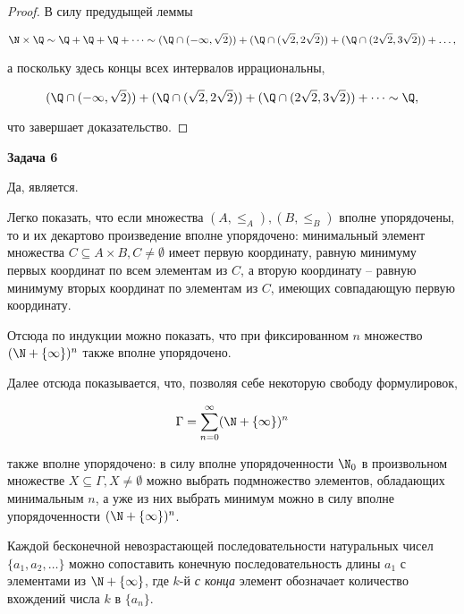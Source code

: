 		\begin{proof}
			В силу предудыщей леммы

			\begin{equation*}
				\N \times \Q \sim \Q + \Q + \Q + \dots \sim (\Q \cap (-\infty, \sqrt{2})) + (\Q \cap (\sqrt{2}, 2\sqrt{2})) + (\Q \cap (2\sqrt{2}, 3\sqrt{2})) + \dots,
			\end{equation*}

			а поскольку здесь концы всех интервалов иррациональны,

			\begin{equation*}
				(\Q \cap (-\infty, \sqrt{2})) + (\Q \cap (\sqrt{2}, 2\sqrt{2})) + (\Q \cap (2\sqrt{2}, 3\sqrt{2})) + \dots \sim \Q,
			\end{equation*}

			что завершает доказательство.
		\end{proof}


	\begin{center}
    \textbf{Задача 6}
\end{center}
		Да, является.

		Легко показать, что если множества $(A, \le_A), (B, \le_B)$ вполне упорядочены, то и их декартово произведение вполне упорядочено: минимальный элемент множества $C \subseteq A \times B, C \ne \emptyset$ имеет первую координату, равную минимуму первых координат по всем элементам из $C$, а вторую координату -- равную минимуму вторых координат по элементам из $C$, имеющих совпадающую первую координату.

		Отсюда по индукции можно показать, что при фиксированном $n$ множество $(\N + \{\infty\})^n$ также вполне упорядочено.

		Далее отсюда показывается, что, позволяя себе некоторую свободу формулировок,

		\begin{equation*}
			\Gamma = \sum_{n=0}^\infty (\N + \{\infty\})^n
		\end{equation*}

		также вполне упорядочено: в силу вполне упорядоченности $\N_0$ в произвольном множестве $X \subseteq \Gamma, X \ne \emptyset$ можно выбрать подмножество элементов, обладающих минимальным $n$, а уже из них выбрать минимум можно в силу вполне упорядоченности $(\N + \{\infty\})^n$.

		Каждой бесконечной невозрастающей последовательности натуральных чисел $\{a_1, a_2, \dots\}$ можно сопоставить конечную последовательность длины $a_1$ с элементами из $\N + \{\infty\}$, где $k$-й \textit{с конца} элемент обозначает количество вхождений числа $k$ в $\{a_n\}$.

